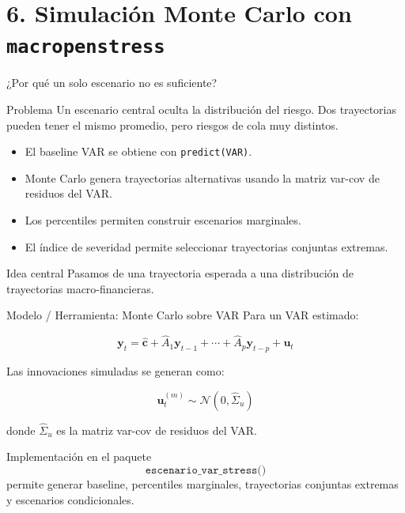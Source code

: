 \documentclass[10pt,aspectratio=169]{beamer}
\begin{document}
\section{6. Simulación Monte Carlo con \texttt{macropenstress}}

\begin{frame}{¿Por qué un solo escenario no es suficiente?}
\begin{block}{Problema}
Un escenario central oculta la distribución del riesgo. Dos trayectorias pueden tener el mismo promedio, pero riesgos de cola muy distintos.
\end{block}

\begin{itemize}
  \item El baseline VAR se obtiene con \texttt{predict(VAR)}.
  \item Monte Carlo genera trayectorias alternativas usando la matriz var-cov de residuos del VAR.
  \item Los percentiles permiten construir escenarios marginales.
  \item El índice de severidad permite seleccionar trayectorias conjuntas extremas.
\end{itemize}

\vspace{0.3cm}
\begin{exampleblock}{Idea central}
Pasamos de una trayectoria esperada a una distribución de trayectorias macro-financieras.
\end{exampleblock}
\end{frame}

\begin{frame}{Modelo / Herramienta: Monte Carlo sobre VAR}
Para un VAR estimado:

\[
\bm y_t =
\hat{\bm c}
+
\hat A_1 \bm y_{t-1}
+
\cdots
+
\hat A_p \bm y_{t-p}
+
\bm u_t
\]

Las innovaciones simuladas se generan como:

\[
\bm u_t^{(m)} \sim \mathcal{N}(0,\hat\Sigma_u)
\]

donde \(\hat\Sigma_u\) es la matriz var-cov de residuos del VAR.

\begin{block}{Implementación en el paquete}
\[
\texttt{escenario\_var\_stress()}
\]
permite generar baseline, percentiles marginales, trayectorias conjuntas extremas y escenarios condicionales.
\end{block}
\end{frame}
\end{document}
